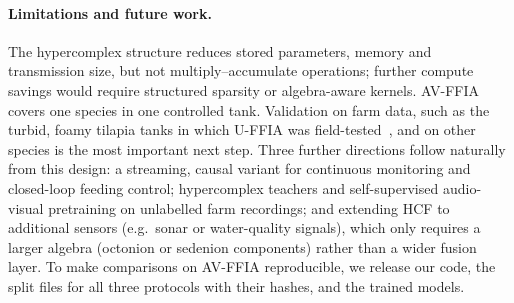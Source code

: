 \paragraph{Limitations and future work.}
The hypercomplex structure reduces stored parameters, memory and transmission size, but not
multiply--accumulate operations; further compute savings would require structured sparsity or
algebra-aware kernels. AV-FFIA covers one species in one controlled tank. Validation on farm data, such
as the turbid, foamy tilapia tanks in which U-FFIA was field-tested~\cite{cui2024uffia}, and on other
species is the most important next step. Three further directions follow naturally from this design:
a streaming, causal variant for continuous monitoring and closed-loop feeding control; hypercomplex
teachers and self-supervised audio-visual pretraining on unlabelled farm recordings; and extending HCF
to additional sensors (e.g.\ sonar or water-quality signals), which only requires a larger algebra
(octonion or sedenion components) rather than a wider fusion layer. To make comparisons on AV-FFIA
reproducible, we release our code, the split files for all three protocols with their hashes, and the
trained models.
